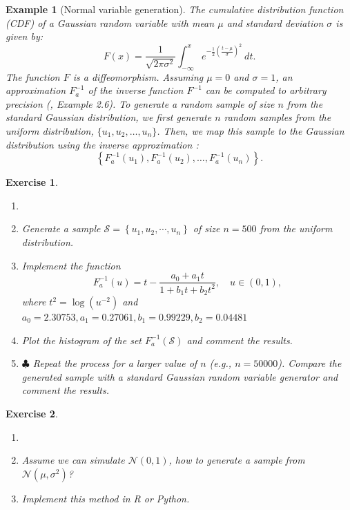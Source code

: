 \documentclass{article}\usepackage[]{graphicx}\usepackage[]{xcolor}
\newtheorem{exercise}{Exercise}
\newtheorem{example}{Example}
\begin{document}
\begin{example}[Normal variable generation]

  The cumulative distribution function (CDF) of a Gaussian random variable with mean $\mu$ and standard deviation $\sigma$ is given by:  
  \begin{equation}\label{CDF of a Gaussian(mu,sigma)}
  F(x) = \frac{1}{\sqrt{2\pi\sigma^2}} \int_{-\infty}^x e^{-\frac{1}{2}\left(\frac{t-\mu}{\sigma}\right)^2}~dt.
  \end{equation}  
  The function $F$ is a diffeomorphism. Assuming $\mu = 0$ and $\sigma = 1$, an approximation $F_a^{-1}$ of the inverse function $F^{-1}$ can be computed to arbitrary precision (\cite{RobertCasela1999MonteCarloSM}, Example 2.6). To generate a random sample of size $n$ from the standard Gaussian distribution, we first generate $n$ random samples from the uniform distribution, $\{u_1, u_2, \ldots, u_n\}$. Then, we map this sample to the Gaussian distribution using the inverse approximation :  
  \[
  \left\{F_a^{-1}(u_1), F_a^{-1}(u_2), \ldots, F_a^{-1}(u_n)\right\}.
  \]
  
  \end{example}
  
  \begin{exercise}
  \begin{enumerate}
  \item[] 
  \item Generate a sample $\mathcal{S} = \left\{u_1, u_2, \cdots, u_n\right\}$ of size $n = 500$ from the uniform distribution.
  
  \item Implement the function
  \[
  F_a^{-1}(u) = t - \frac{a_0 + a_1t}{1+b_1t+b_2t^2}, \quad u\in(0,1),
  \]
  where $t^2 = \log\left(u^{-2}\right)$ and $a_0 = 2.30753, a_1 = 0.27061, b_1 = 0.99229, b_2 = 0.04481$
  
  \item Plot the histogram of the set $F_a^{-1}(\mathcal{S})$ and comment the results.
  
  \item$\clubsuit$ Repeat the process for a larger value of $n$ (e.g., $n = 50000$). Compare the generated sample with a standard Gaussian random variable generator and comment the results.
  
  \end{enumerate}
  \end{exercise}


\begin{exercise}

\begin{enumerate}
\item[]
\item Assume we can simulate $\mathcal{N}(0,1)$, how to generate a sample from $\mathcal{N}(\mu,\sigma^2)$?
\item Implement this method in R or Python.
\end{enumerate}

\end{exercise}
\end{document}
